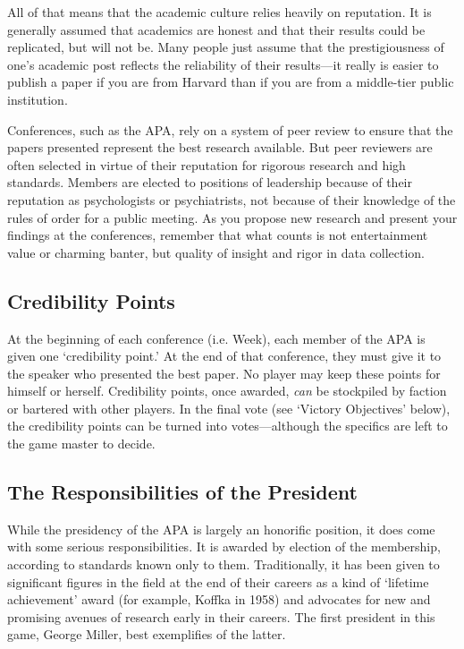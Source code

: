 \begin{refsection}
All of that means that the academic culture relies heavily on reputation. It is generally assumed that academics are honest and that their results could be replicated, but will not be. Many people just assume that the prestigiousness of one's academic post reflects the reliability of their results---it really is easier to publish a paper if you are from Harvard than if you are from a middle-tier public institution.

Conferences, such as the APA, rely on a system of peer review to ensure that the papers presented represent the best research available. But peer reviewers are often selected in virtue of their reputation for rigorous research and high standards. Members are elected to positions of leadership because of their reputation as psychologists or psychiatrists, not because of their knowledge of the rules of order for a public meeting. As you propose new research and present your findings at the conferences, remember that what counts is not entertainment value or charming banter, but quality of insight and rigor in data collection.

\subsection{Credibility Points}
\label{credibilitypoints}

At the beginning of each conference (i.e. Week), each member of the APA is given one `credibility point.' At the end of that conference, they must give it to the speaker who presented the best paper. No player may keep these points for himself or herself. Credibility points, once awarded, \emph{can} be stockpiled by faction or bartered with other players. In the final vote (see `Victory Objectives' below), the credibility points can be turned into votes---although the specifics are left to the game master to decide. 

\subsection{The Responsibilities of the President}
\label{theresponsibilitiesofthepresident}

While the presidency of the APA is largely an honorific position, it does come with some serious responsibilities. It is awarded by election of the membership, according to standards known only to them. Traditionally, it has been given to significant figures in the field at the end of their careers as a kind of `lifetime achievement' award (for example, Koffka in 1958) and advocates for new and promising avenues of research early in their careers. The first president in this game, George Miller, best exemplifies of the latter.


\end{refsection}
